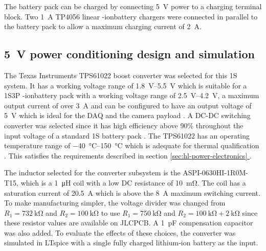 \documentclass[]{report}
\newcommand*{\secref}[1]{section \hyperref[{#1}]{\ref*{#1} \nameref*{#1}}}
\newcommand{\liion}{\ce{Li}-ion}
\begin{document}
The battery pack can be charged by connecting \SI{5}{\volt} power to a charging terminal block. Two \SI{1}{\ampere} TP4056 linear \liion battery chargers were connected in parallel to the battery pack to allow a maximum charging current of \SI{2}{\ampere}.

\subsection{\SI{5}{\volt} power conditioning design and simulation}

The Texas Instruments TPS61022 boost converter was selected for this 1S system. It has a working voltage range of \SIrange{1.8}{5.5}{\volt} which is suitable for a 1S3P \liion battery pack with a working voltage range of \SIrange{2.5}{4.2}{\volt}, a maximum output current of over \SI{3}{\ampere} and can be configured to have an output voltage of \SI{5}{\volt} which is ideal for the DAQ and the camera payload \cite{ti2021tps61022}. A DC-DC switching converter was selected since it has high efficiency above 90\% throughout the input voltage of a standard 1S battery pack \cite{ti2021tps61022}. The TPS61022 has an operating temperature range of \SIrange{-40}{150}{\degreeCelsius} which is adequate for thermal qualification \cite{ti2021tps61022}. This satisfies the requirements described in \secref{sec:hl-power-electronics}.

The inductor selected for the converter subsystem is the ASPI-0630HI-1R0M-T15, which is a \SI{1}{\micro\henry} coil with a low DC resistance of \SI{10}{\milli\ohm}. The coil has a saturation current of \SI{20.5}{\ampere} which is above the \SI{8}{\ampere} maximum switching current. To make manufacturing simpler, the voltage divider was changed from $R_1=\SI{732}{\kilo\ohm}$ and $R_2=\SI{100}{\kilo\ohm}$ to use $R_1=\SI{750}{\kilo\ohm}$ and $R_2=\SI{100}{\kilo\ohm}+\SI{2}{\kilo\ohm}$ since these resistor values are available on JLCPCB.  A \SI{1}{\pico\farad} compensation capacitor was also added. To evaluate the effects of these choices, the converter was simulated in LTspice with a single fully charged lithium-ion battery as the input.
\end{document}

